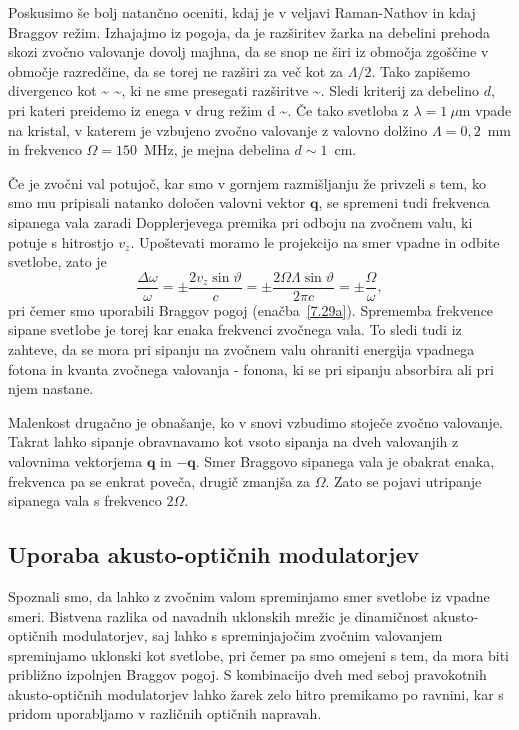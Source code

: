 \begin{remark}
 Poskusimo še bolj natančno oceniti, kdaj je v veljavi Raman-Nathov in kdaj Braggov režim. 
Izhajajmo iz pogoja, da je razširitev žarka na debelini prehoda skozi zvočno valovanje dovolj
 majhna, da se snop ne širi iz območja zgoščine v območje razredčine, da se torej ne razširi za 
 več kot za $\Lambda/2$. Tako zapišemo
 divergenco kot
 \beq
 \delta\vartheta \sim {} \sim \frac{2\lambda}{\Lambda},
 \eeq
 ki ne sme presegati razširitve
 \beq
 \delta \vartheta \sim {}.
 \eeq
Sledi kriterij za debelino $d$, pri kateri preidemo iz enega v drug režim
\beq
d \sim {}.
\eeq
Če tako svetloba z $\lambda = 1~\mu$m vpade na kristal, v katerem je vzbujeno zvočno
valovanje z valovno dolžino $\Lambda = 0,2$~mm in frekvenco $\Omega = 150$~MHz, je mejna 
debelina $d \sim 1$~cm.
\end{remark}

Če je zvočni val potujoč, kar smo v gornjem razmišljanju že privzeli
s tem, ko smo mu pripisali natanko določen valovni vektor $\mathbf{q}$,
se spremeni tudi frekvenca sipanega vala zaradi Dopplerjevega premika
pri odboju na zvočnem valu, ki potuje s hitrostjo $v_{z}$. Upoštevati
moramo le projekcijo na smer vpadne in odbite svetlobe, zato je 
\begin{equation}
\frac{\Delta\omega}{\omega}=\pm\frac{2v_{z}\sin\vartheta}{c}=
\pm\frac{2\Omega\Lambda\sin\vartheta}{2 \pi c}=\pm\frac{\Omega}{\omega},
\label{7.32}
\end{equation}
pri čemer smo uporabili Braggov pogoj (enačba~\ref{7.29a}). Sprememba frekvence
sipane svetlobe je torej kar enaka frekvenci zvočnega vala. To sledi tudi
iz zahteve, da se mora pri sipanju na zvočnem valu ohraniti energija
vpadnega fotona in kvanta zvočnega valovanja - fonona,
ki se pri sipanju absorbira ali pri njem nastane.

Malenkost drugačno je obnašanje, ko v snovi vzbudimo stoječe zvočno valovanje. 
Takrat lahko sipanje obravnavamo kot vsoto sipanja na dveh valovanjih z valovnima 
vektorjema $\mathbf{q}$ in $-\mathbf{q}$. Smer Braggovo sipanega vala je obakrat enaka, 
frekvenca pa se enkrat poveča, drugič zmanjša za $\Omega$. Zato se pojavi utripanje
sipanega vala s frekvenco $2\Omega$.

\subsection*{Uporaba akusto-optičnih modulatorjev}
Spoznali smo, da lahko z zvočnim valom spreminjamo smer svetlobe iz vpadne smeri.
Bistvena razlika od navadnih uklonskih mrežic je dinamičnost akusto-optičnih modulatorjev, 
saj lahko s spreminjajočim zvočnim valovanjem spreminjamo uklonski kot svetlobe,
pri čemer pa smo omejeni s tem, da mora biti približno izpolnjen Braggov pogoj.
S kombinacijo dveh med seboj pravokotnih akusto-optičnih modulatorjev lahko žarek zelo hitro
premikamo po ravnini, kar s pridom uporabljamo v različnih optičnih napravah. 


